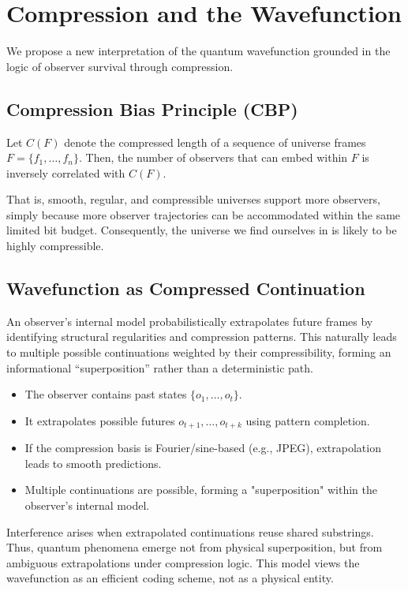 \documentclass[12pt]{article}
\begin{document}
\section{Compression and the Wavefunction}

We propose a new interpretation of the quantum wavefunction grounded in the logic of observer survival through compression.

\subsection{Compression Bias Principle (CBP)}

Let $C(F)$ denote the compressed length of a sequence of universe frames $F = \{f_1, \ldots, f_n\}$. Then, the number of observers that can embed within $F$ is inversely correlated with $C(F)$.

That is, smooth, regular, and compressible universes support more observers, simply because more observer trajectories can be accommodated within the same limited bit budget. Consequently, the universe we find ourselves in is likely to be highly compressible.

\subsection{Wavefunction as Compressed Continuation}

An observer’s internal model probabilistically extrapolates future frames by identifying structural regularities and compression patterns. This naturally leads to multiple possible continuations weighted by their compressibility, forming an informational “superposition” rather than a deterministic path.

\begin{itemize}
    \item The observer contains past states $\{o_1, \ldots, o_t\}$.
    \item It extrapolates possible futures $o_{t+1}, \ldots, o_{t+k}$ using pattern completion.
    \item If the compression basis is Fourier/sine-based (e.g., JPEG), extrapolation leads to smooth predictions.
    \item Multiple continuations are possible, forming a "superposition" within the observer's internal model.
\end{itemize}

Interference arises when extrapolated continuations reuse shared substrings. Thus, quantum phenomena emerge not from physical superposition, but from ambiguous extrapolations under compression logic. This model views the wavefunction as an efficient coding scheme, not as a physical entity.
\end{document}
